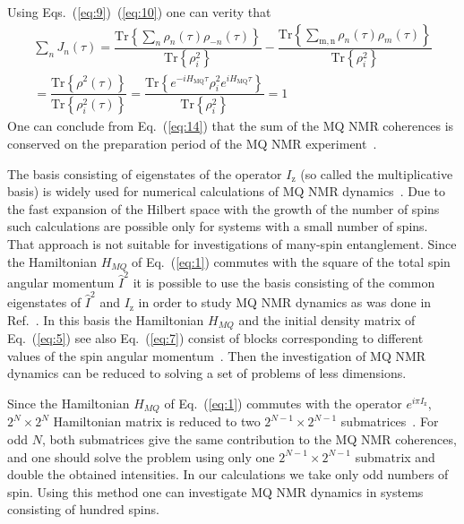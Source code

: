 \documentclass[review]{elsarticle}
\begin{document}
%
Using Eqs.~(\ref{eq:9})~(\ref{eq:10}) one can verity that 
%
\begin{multline}
    \label{eq:14}
    \sum\limits_{n} J_{n}(\tau)
    = \dfrac{
        \mathrm{Tr} \left\{
            \sum_{n} \rho_{n}(\tau) \rho_{-n}(\tau)
        \right\}}
    {\mathrm{Tr} \left\{ \rho^2_{i} \right\}} 
    - \dfrac{
        \mathrm{Tr} \left\{
            \sum_{\mathrm{m,n}} \rho_n(\tau)\rho_m(\tau)
    \right\}}
    {\mathrm{Tr} \left\{\rho^2_{i}\right\}}
    \\
    = \dfrac{
        \mathrm{Tr}\left\{\rho^2(\tau)\right\}
    }
    {
        \mathrm{Tr}\left\{\rho^2_{i}(\tau)\right\}
    }
    = \dfrac{
        \mathrm{Tr} \left\{ 
            e^{-i H_\mathrm{MQ} \tau} 
            \rho^{2}_{i}
            e^{i H_\mathrm{MQ} \tau} 
        \right\}
    }
    {
        \mathrm{Tr} \left\{ \rho_{i}^{2} \right\}
    } 
    = 1
\end{multline}
%
One can conclude from Eq.~(\ref{eq:14}) that the sum of the MQ NMR coherences is conserved on the preparation period of the MQ NMR experiment~\cite{Nielsen_2009}.

The basis consisting of eigenstates of the operator $I_\mathrm{z}$ (so called the multiplicative basis) is widely used for numerical calculations of MQ NMR dynamics~\cite{Zhang_2009}.
Due to the fast expansion of the Hilbert space with the growth of the number of spins such calculations are possible only for systems with a small number of spins.
That approach is not suitable for investigations of many-spin entanglement.
Since the Hamiltonian $H_{MQ}$ of Eq.~(\ref{eq:1}) commutes with the square of the total spin angular momentum $\hat I^2$ 
it is possible to use the basis consisting of the common eigenstates of $\hat I^2$ and $I_\mathrm{z}$ in order to study MQ NMR dynamics as was done in Ref.~\cite{Doronin_2009,Doronin_2011,Doronin_2019}.
In this basis the Hamiltonian $H_{MQ}$ and the initial density matrix of Eq.~(\ref{eq:5}) see also Eq.~(\ref{eq:7}) consist of blocks corresponding to different values of the spin angular momentum~\cite{Doronin_2009}.
Then the investigation of MQ NMR dynamics can be reduced to solving a set of problems of less dimensions.

Since the Hamiltonian $H_{MQ}$ of Eq.~(\ref{eq:1}) commutes with the operator $e^{i\pi I_\mathrm{z}}$, $2^N \times 2^N$ Hamiltonian matrix is reduced to two $2^{N-1} \times 2^{N-1}$ submatrices~\cite{Doronin_2009}.
For odd $N$, both submatrices give the same contribution to the MQ NMR coherences, and one should solve the problem using only one $2^{N-1} \times 2^{N-1}$ submatrix and double the obtained intensities. 
In our calculations we take only odd numbers of spin.
Using this method one can investigate MQ NMR dynamics in systems consisting of hundred spins.
\end{document}
